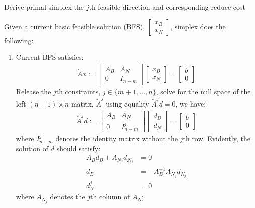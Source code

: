 \documentclass[11pt]{article}
\newcommand*{\xfield}[1]{\begin{mdframed}\centering #1\end{mdframed}\bigskip}
\newenvironment{field}{}{}
\newenvironment{note}{}{}
\begin{document}
\begin{note}
  \xfield{Derive primal simplex the \(j\)th feasible direction and
    corresponding reduce cost}
  \begin{field}
    Given a current basic feasible solution (BFS), \(\begin{bmatrix} x_B \\
      x_N \end{bmatrix}\), simplex does the following:
    \begin{enumerate}
    \item Current BFS satisfies:
      \begin{align*}
        \tilde{A} x :=
        \begin{bmatrix} A_B & A_N \\ 0 & I_{n-m} \end{bmatrix}
        \begin{bmatrix} x_B \\ x_N \end{bmatrix} =
        \begin{bmatrix} b \\ 0 \end{bmatrix}
      \end{align*}
      Release the \(j\)th constraints, \(j \in \{m+1, \ldots, n\}\),
      solve for the null space of the left \((n-1) \times n\) matrix,
      \(\tilde{A}^j\) using equality \(\tilde{A}^j d = 0\), we have:
      \begin{align*}
        \tilde{A}^j d :=
        \begin{bmatrix} A_B & A_N \\ 0 & I^j_{n-m} \end{bmatrix}
        \begin{bmatrix} d_B \\ d_N \end{bmatrix} =
        \begin{bmatrix} b \\ 0 \end{bmatrix}
      \end{align*}
      where \(I^j_{n-m}\) denotes the identity matrix without the
      \(j\)th row. Evidently, the solution of \(d\) should satisfy:
      \begin{align*}
        A_B d_B + A_{N_j} d_{N_j} & = 0 \\
        d_B & = - A_B^{-1} A_{N_j} d_{N_j} \\
        d^j_N & = 0
      \end{align*}
      where \(A_{N_j}\) denotes the \(j\)th column of \(A_N\);

\end{enumerate}
\end{field}
\end{note}
\end{document}
